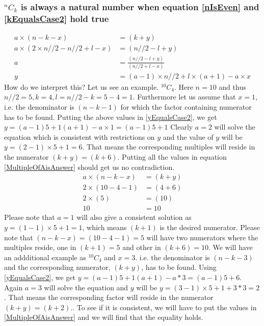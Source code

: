 \documentclass[12pt, twoside]{article}
\newcommand*{\Combination}[2]{{}^{#1}C_{#2}}%
\begin{document}
\subsubsection{$\Combination{n}{k}$ is always a natural number when equation \eqref{nIsEven} and \eqref{kEqualsCase2} hold true}\label{ProofkEqualsCase2}
\begin{align}
	a \times (n-k-x) &= (k+y) \nonumber \\
	a \times (2\times n//2 - n//2 + l - x) &= (n//2 - l + y) \nonumber \\
	a &= \frac{(n//2 - l + y)}{(n//2 + l - x)} \nonumber \\
	y &= (a-1)\times n//2 + l \times (a+1) - a\times x \label{yEqualsCase2}	
\end{align}
How do we interpret this? Let us see an example. \newline
$\Combination{10}{4}$. Here $n = 10$ and thus $n//2 = 5, k = 4, l = n//2 - k = 5 -4 = 1$. Furthermore let us assume that $x = 1$, i.e. the denominator is $(n-k-1)$ for which the factor containing numerator has to be found.\newline
Putting the above values in \eqref{yEqualsCase2}, we get
$y = (a-1)5+1(a+1)-a\times 1 = (a-1)5+1$\newline
Clearly $a = 2$ will solve the equation which is consistent with restrictions on $y$ and the value of $y$ will be $y=(2-1)\times5 + 1=6$. That means the corresponding multiples will reside in the numerator $(k+y)=(k+6)$.\newline
Putting all the values in equation \eqref{MultipleOfAisAnswer} should get us no contradiction.
\begin{align}
	a \times (n-k-x) &= (k+y) \nonumber \\
	2 \times (10-4-1) &= (4+6) \nonumber \\
	2 \times (5) &= (10) \nonumber \\
	10 &= 10 \nonumber
\end{align}
Please note that $a = 1$ will also give a consistent solution as $y=(1-1)\times5 + 1=1$, which means $(k+1)$ is the desired numerator. Please note that $(n-k-x)=(10-4-1)=5$ will have two numerators where the multiples reside, one in $(k+1)=5$ and other in $(k+6)=10$.
We will have an addditional example as $\Combination{10}{4}$ and $x = 3$. i.e. the denominator is $(n-k-3)$ and the corresponding numerator, $(k+y)$, has to be found. Using \eqref{yEqualsCase2}, we get $y = (a-1)5+1(a+1)-a*3 = (a-1)5+6$\newline. Again $a=3$ will solve the equation and $y$ will be $y=(3-1)\times5 +1+ 3*3=2$. That means the corresponding factor will reside in the numerator $(k+y)=(k+2)$.\newline. To see if it is consistent, we will have to put the values in \eqref{MultipleOfAisAnswer} and we will find that the equality holds.
\end{document}
